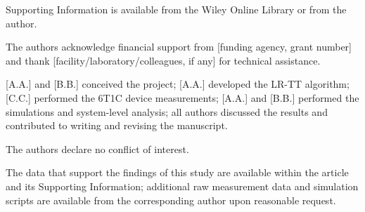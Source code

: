 \documentclass[AMA,LATO2COL]{WileyNJDv5}
\begin{document}
Supporting Information is available from the Wiley Online Library or from the author.

The authors acknowledge financial support from [funding agency, grant number] and thank [facility/laboratory/colleagues, if any] for technical assistance.

[A.A.] and [B.B.] conceived the project; [A.A.] developed the LR-TT algorithm; [C.C.] performed the 6T1C device measurements; [A.A.] and [B.B.] performed the simulations and system-level analysis; all authors discussed the results and contributed to writing and revising the manuscript.

The authors declare no conflict of interest.

The data that support the findings of this study are available within the article and its Supporting Information; additional raw measurement data and simulation scripts are available from the corresponding author upon reasonable request.

%


\end{document}

